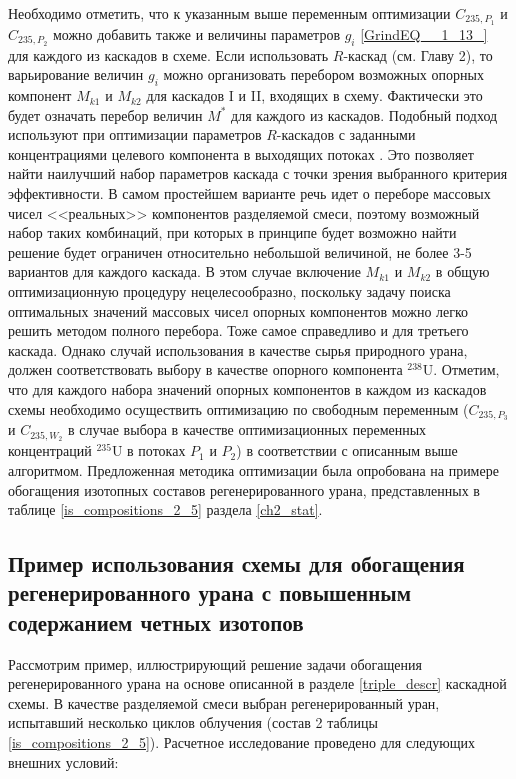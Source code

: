 Необходимо отметить, что к указанным выше переменным оптимизации $C_{235,{P_1}}$ и $C_{235,{P_2}}$ можно добавить также и величины параметров $g_{i}$  \ref{GrindEQ__1_13_} для каждого из каскадов в схеме. Если использовать $R$-каскад (см. Главу 2), то варьирование величин $g_{i}$ можно организовать перебором возможных опорных компонент $M_{k1}$ и $M_{k2}$ для каскадов I и II, входящих в схему. Фактически это будет означать перебор величин $M^{*}$ для каждого из каскадов. Подобный подход используют при оптимизации параметров $R$-каскадов с заданными концентрациями целевого компонента в выходящих потоках \cite{songComparativeStudyModel2010, sulaberidzeSravnenieOptimalnyhModelnyh2008}. Это позволяет найти наилучший набор параметров каскада с точки зрения выбранного критерия эффективности. В самом простейшем варианте речь идет о переборе массовых чисел <<реальных>> компонентов разделяемой смеси, поэтому возможный набор таких комбинаций, при которых в принципе будет возможно найти решение будет ограничен относительно небольшой величиной, не более 3-5 вариантов для каждого каскада. В этом случае включение $M_{k1}$ и $M_{k2}$ в общую оптимизационную процедуру нецелесообразно, поскольку задачу поиска оптимальных значений массовых чисел опорных компонентов можно легко решить методом полного перебора. Тоже самое справедливо и для третьего каскада.
Однако случай использования в качестве сырья природного урана, должен соответствовать выбору в качестве опорного компонента $^{238}$U. Отметим, что для каждого набора значений опорных компонентов в каждом из каскадов схемы необходимо осуществить оптимизацию по свободным переменным ($C_{235,P_3}$ и $C_{235,W_2}$ в случае выбора в качестве оптимизационных переменных концентраций $^{235}$U в потоках $P_1$ и $P_2$) в соответствии с описанным выше алгоритмом. 
Предложенная методика оптимизации была опробована на примере обогащения изотопных составов регенерированного урана, представленных в таблице \ref{is_compositions_2_5} раздела \ref{ch2_stat}.

\subsection{Пример использования схемы для обогащения регенерированного урана с повышенным содержанием четных изотопов}\label{example_trip}

Рассмотрим пример, иллюстрирующий решение задачи обогащения регенерированного урана на основе описанной в разделе \ref{triple_descr} каскадной схемы. В качестве разделяемой смеси выбран регенерированный уран, испытавший несколько циклов облучения (состав 2 таблицы \ref{is_compositions_2_5}). Расчетное исследование проведено для следующих внешних условий:

